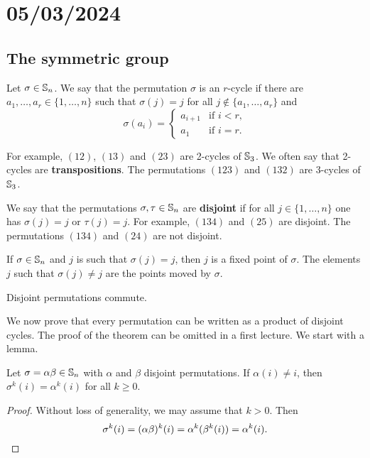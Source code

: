 \section{05/03/2024}

\subsection{The symmetric group}

Let $\sigma\in\mathbb{S}_n$. We say that the permutation $\sigma$ is an $r$-cycle 
if there are $a_1,\dots,a_r\in\{1,\dots,n\}$ such that 
$\sigma(j)=j$ for all $j\not\in\{a_1,\dots,a_r\}$ and 
\[
\sigma(a_i)=\begin{cases}
a_{i+1} & \text{if $i<r$},\\
a_1 & \text{if $i=r$}.
\end{cases}
\]

For example, $(12)$, $(13)$ and $(23)$ are 2-cycles of 
$\mathbb{S}_3$. We often say that 2-cycles are \textbf{transpositions}.
The permutations $(123)$ and $(132)$ are 3-cycles of $\mathbb{S}_3$.

We say that the permutations $\sigma,\tau\in\mathbb{S}_n$ 
are \textbf{disjoint} if for all 
$j\in\{1,\dots,n\}$
one has $\sigma(j)=j$ or $\tau(j)=j$. For example, 
$(134)$ and $(25)$ are disjoint. The permutations $(134)$ and 
$(24)$ are not disjoint. 

If $\sigma\in\mathbb{S}_n$ and $j$ is such that 
$\sigma(j)=j$, then $j$ is a fixed point of $\sigma$. The elements 
$j$ such that 
$\sigma(j)\ne j$ are the points moved by 
$\sigma$.

\begin{claim}
Disjoint permutations commute. 
\end{claim}


We now prove that every permutation can be written 
as a product of disjoint cycles. 
The proof of the theorem can be omitted in a first 
lecture. 
We start with a lemma. 

\begin{lemma}
        Let $\sigma=\alpha\beta\in\mathbb{S}_n$ with $\alpha$ and $\beta$ disjoint permutations. If $\alpha(
i)\ne i$, then $\sigma^k(i)=\alpha^k(i)$ for all $k\geq0$.
\end{lemma}

\begin{proof}
    Without loss of generality, we may assume that $k>0$. Then \[
    \sigma^k(i)=(\alpha\beta)^k(i)=\alpha^k(\beta^k(i))=\alpha^k(i).\qedhere
    \]
\end{proof}

